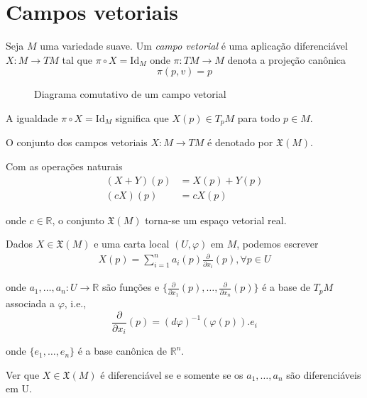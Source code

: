 \section{Campos vetoriais}

\begin{defi}
	Seja $M$ uma variedade suave. Um \emph{campo vetorial} é uma aplicação diferenciável $X: M \rightarrow TM$ tal que $\pi \circ X = \text{Id}_M$ onde $\pi: TM \rightarrow M$ denota a projeção canônica
	\begin{equation*}
	\pi(p,v) = p
	\end{equation*}
\end{defi}

\begin{figure}
	\centering
	\caption{Diagrama comutativo de um campo vetorial}
\end{figure}

\begin{obse}
	A igualdade $\pi \circ X = \text{Id}_M$ significa que $X(p) \in T_p M$ para todo $p \in M$.
\end{obse}

\begin{nota}
	O conjunto dos campos vetoriais $X: M \rightarrow TM$ é denotado por $\mathfrak{X}(M)$.
\end{nota}

\begin{obse}
	Com as operações naturais
	\begin{align*}
		(X+Y)(p) &= X(p) + Y(p)\\
		(cX)(p) &= c X(p)
	\end{align*}
	
	onde $c \in \mathbb{R}$, o conjunto $\mathfrak{X}(M)$ torna-se um espaço vetorial real.
\end{obse}

\begin{obse}
	Dados $X \in \mathfrak{X}(M)$ e uma carta local $(U, \varphi)$ em $M$, podemos escrever
	\begin{align*}
		X(p) = \sum_{i=1}^n a_i (p) \frac{\partial}{\partial x_i} (p), \forall p \in U
	\end{align*}
	
	onde $a_1, \ldots, a_n: U \rightarrow \mathbb{R}$ são funções e $\{ \frac{\partial}{\partial x_1}(p), \ldots, \frac{\partial}{\partial x_n}(p) \}$ é a base de $T_p M$ associada a $\varphi$, i.e.,
	\begin{equation*}
		\frac{\partial}{\partial x_i} (p) = (d \varphi)^{-1}(\varphi(p)).e_i
	\end{equation*}
	
	onde $\{ e_1, \ldots, e_n \}$ é a base canônica de $\mathbb{R}^n$.
\end{obse}

Ver que $X \in \mathfrak{X}(M)$ é diferenciável se e somente se os $a_1, \ldots, a_n$ são diferenciáveis em U.